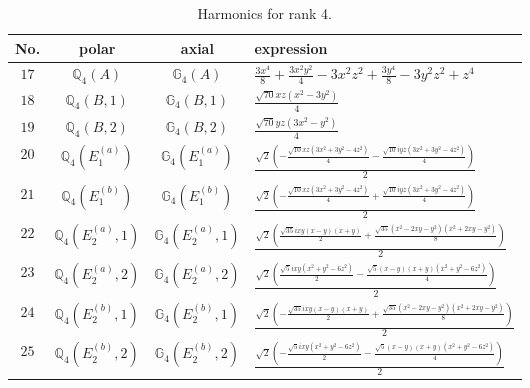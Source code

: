 \documentclass[fleqn,8pt,landscape]{jsarticle}
\begin{document}
\begin{table}[ht!]
\begin{center}
\caption{Harmonics for rank 4.}
\renewcommand{\arraystretch}{1.3}
\begin{tabular}{cccl} \hline \hline
No. & polar & axial & expression \\ \hline
$ 17 $ & $ \mathbb{Q}_{4}(A) $ & $ \mathbb{G}_{4}(A) $ & $ \frac{3 x^{4}}{8} + \frac{3 x^{2} y^{2}}{4} - 3 x^{2} z^{2} + \frac{3 y^{4}}{8} - 3 y^{2} z^{2} + z^{4} $ \\
$ 18 $ & $ \mathbb{Q}_{4}(B,1) $ & $ \mathbb{G}_{4}(B,1) $ & $ \frac{\sqrt{70} x z \left(x^{2} - 3 y^{2}\right)}{4} $ \\
$ 19 $ & $ \mathbb{Q}_{4}(B,2) $ & $ \mathbb{G}_{4}(B,2) $ & $ \frac{\sqrt{70} y z \left(3 x^{2} - y^{2}\right)}{4} $ \\
$ 20 $ & $ \mathbb{Q}_{4}(E_{1}^{(a)}) $ & $ \mathbb{G}_{4}(E_{1}^{(a)}) $ & $ \frac{\sqrt{2} \left(- \frac{\sqrt{10} x z \left(3 x^{2} + 3 y^{2} - 4 z^{2}\right)}{4} - \frac{\sqrt{10} i y z \left(3 x^{2} + 3 y^{2} - 4 z^{2}\right)}{4}\right)}{2} $ \\
$ 21 $ & $ \mathbb{Q}_{4}(E_{1}^{(b)}) $ & $ \mathbb{G}_{4}(E_{1}^{(b)}) $ & $ \frac{\sqrt{2} \left(- \frac{\sqrt{10} x z \left(3 x^{2} + 3 y^{2} - 4 z^{2}\right)}{4} + \frac{\sqrt{10} i y z \left(3 x^{2} + 3 y^{2} - 4 z^{2}\right)}{4}\right)}{2} $ \\
$ 22 $ & $ \mathbb{Q}_{4}(E_{2}^{(a)},1) $ & $ \mathbb{G}_{4}(E_{2}^{(a)},1) $ & $ \frac{\sqrt{2} \left(\frac{\sqrt{35} i x y \left(x - y\right) \left(x + y\right)}{2} + \frac{\sqrt{35} \left(x^{2} - 2 x y - y^{2}\right) \left(x^{2} + 2 x y - y^{2}\right)}{8}\right)}{2} $ \\
$ 23 $ & $ \mathbb{Q}_{4}(E_{2}^{(a)},2) $ & $ \mathbb{G}_{4}(E_{2}^{(a)},2) $ & $ \frac{\sqrt{2} \left(\frac{\sqrt{5} i x y \left(x^{2} + y^{2} - 6 z^{2}\right)}{2} - \frac{\sqrt{5} \left(x - y\right) \left(x + y\right) \left(x^{2} + y^{2} - 6 z^{2}\right)}{4}\right)}{2} $ \\
$ 24 $ & $ \mathbb{Q}_{4}(E_{2}^{(b)},1) $ & $ \mathbb{G}_{4}(E_{2}^{(b)},1) $ & $ \frac{\sqrt{2} \left(- \frac{\sqrt{35} i x y \left(x - y\right) \left(x + y\right)}{2} + \frac{\sqrt{35} \left(x^{2} - 2 x y - y^{2}\right) \left(x^{2} + 2 x y - y^{2}\right)}{8}\right)}{2} $ \\
$ 25 $ & $ \mathbb{Q}_{4}(E_{2}^{(b)},2) $ & $ \mathbb{G}_{4}(E_{2}^{(b)},2) $ & $ \frac{\sqrt{2} \left(- \frac{\sqrt{5} i x y \left(x^{2} + y^{2} - 6 z^{2}\right)}{2} - \frac{\sqrt{5} \left(x - y\right) \left(x + y\right) \left(x^{2} + y^{2} - 6 z^{2}\right)}{4}\right)}{2} $ \\
 \hline \hline
\end{tabular}
\end{center}
\end{table}
\end{document}
